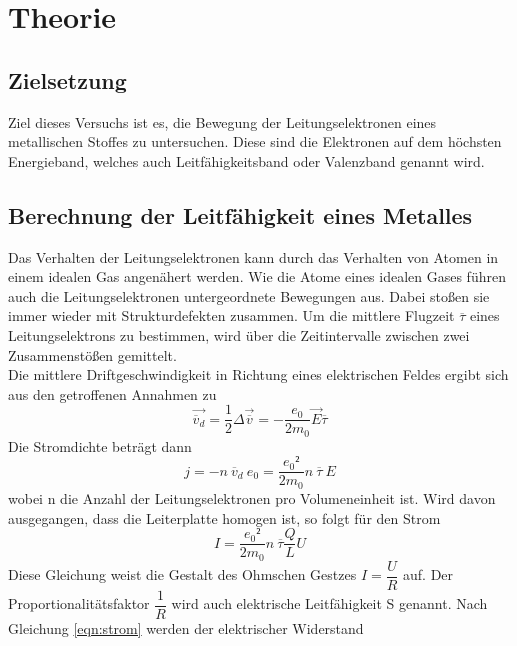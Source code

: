 \section{Theorie}
\label{sec:Theorie}

\subsection{Zielsetzung}
    Ziel dieses Versuchs ist es, die Bewegung der Leitungselektronen eines metallischen Stoffes
    zu untersuchen. Diese sind die Elektronen auf dem höchsten Energieband, welches auch 
    Leitfähigkeitsband oder Valenzband genannt wird. 
\subsection{Berechnung der Leitfähigkeit eines Metalles}
    Das Verhalten der Leitungselektronen kann durch das Verhalten von Atomen in einem
    idealen Gas angenähert werden. Wie die Atome eines idealen Gases führen auch 
    die Leitungselektronen untergeordnete Bewegungen aus. Dabei stoßen sie 
    immer wieder mit Strukturdefekten zusammen.
    Um die mittlere Flugzeit $\overline \tau$ eines Leitungselektrons zu bestimmen, 
    wird über die Zeitintervalle zwischen zwei Zusammenstößen gemittelt.\\
    Die mittlere Driftgeschwindigkeit 
    in Richtung eines elektrischen Feldes ergibt sich aus den getroffenen Annahmen zu 
    \begin{equation}
        \vec{\overline v_d} = \dfrac{1}{2} \Delta \vec{\overline v} = -\dfrac{e_0}{2 m_0} \vec E \overline \tau
    \end{equation}
    Die Stromdichte beträgt dann
    \begin{equation}
        \label{eqn:stromdichte}
        j = - n\ \overline v_d \ e_0 = \dfrac{e_0²}{2 m_0}n\ \overline \tau \ E
    \end{equation}
    wobei n die Anzahl der Leitungselektronen pro Volumeneinheit ist. Wird davon ausgegangen, 
    dass die Leiterplatte homogen ist, so folgt für den Strom 
    \begin{equation}
        \label{eqn:strom}
        I=\dfrac{e_0²}{2 m_0}n\ \overline \tau \dfrac{Q}{L}U
    \end{equation}
    Diese Gleichung weist die Gestalt des Ohmschen Gestzes $I=\dfrac{U}{R}$ auf. 
    Der Proportionalitätsfaktor $\dfrac{1}{R}$ wird auch elektrische Leitfähigkeit S 
    genannt. Nach Gleichung \eqref{eqn:strom} werden der elektrischer Widerstand 
